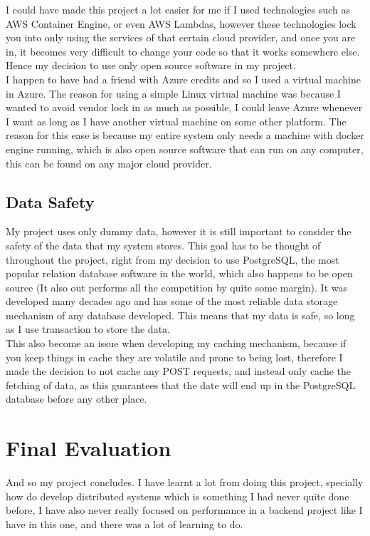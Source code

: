 \documentclass[titlepage]{article}
\begin{document}
I could have made this project a lot easier for me if I used technologies such as AWS Container Engine, or even AWS Lambdas, however these technologies lock you into only using the services of that certain cloud provider, and once you are in, it becomes very difficult to change your code so that it works somewhere else. Hence my decision to use only open source software in my project. \\

I happen to have had a friend with Azure credits and so I used a virtual machine in Azure. The reason for using a simple Linux virtual machine was because I wanted to avoid vendor lock in as much as possible, I could leave Azure whenever I want as long as I have another virtual machine on some other platform. The reason for this ease is because my entire system only needs a machine with docker engine running, which is also open source software that can run on any computer, this can be found on any major cloud provider.

\subsection{Data Safety}
My project uses only dummy data, however it is still important to consider the safety of the data that my system stores. This goal has to be thought of throughout the project, right from my decision to use PostgreSQL, the most popular relation database software in the world, which also happens to be open source (It also out performs all the competition by quite some margin). It was developed many decades ago and has some of the most reliable data storage mechanism of any database developed. This means that my data is safe, so long as I use transaction to store the data. \\

This also become an issue when developing my caching mechanism, because if you keep things in cache they are volatile and prone to being lost, therefore I made the decision to not cache any POST requests, and instead only cache the fetching of data, as this guarantees that the date will end up in the PostgreSQL database before any other place.

\pagebreak
\section{Final Evaluation}

And so my project concludes. I have learnt a lot from doing this project, specially how do develop distributed systems which is something I had never quite done before, I have also never really focused on performance in a backend project like I have in this one, and there was a lot of learning to do. \\
\end{document}
